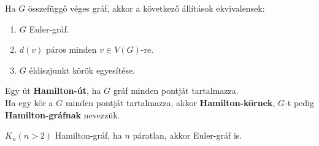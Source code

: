 \begin{frame}
\begin{tcolorbox}[title={Tétel: Euler gráfok}]
Ha $G$ összefüggő véges gráf, akkor a következő állítások ekvivalensek:\\
\begin{enumerate}
\item $G$ Euler-gráf.
\item $d(v)$ páros minden $v \in V(G)$-re.
\item $G$ éldiszjunkt körök egyesítése.
\end{enumerate}
\end{tcolorbox}
\end{frame}

\begin{frame}
\begin{tcolorbox}[title={Def.: Hamilton gráfok}]
Egy út \textbf{Hamilton-út}, ha $G$ gráf minden pontját tartalmazza.\\
\mmedskip
Ha egy kör a $G$ minden pontját tartalmazza, akkor \textbf{Hamilton-körnek}, $G$-t pedig \textbf{Hamilton-gráfnak} nevezzük.
\end{tcolorbox}

\begin{tcolorbox}[title={Ész}]
$K_n(n > 2)$ Hamilton-gráf, ha $n$ páratlan, akkor Euler-gráf is.
\end{tcolorbox}



\begin{tcolorbox}[title={Példák}]
\begin{tcbposter}[
poster = {height=7cm,spacing=2mm,rows=3},
boxes = {colframe=mybg, colback=mybg},
]





\end{tcbposter}
\end{tcolorbox}
\end{frame}
